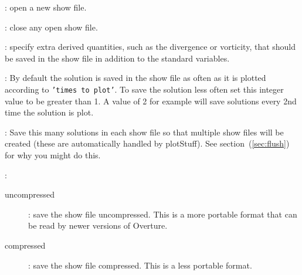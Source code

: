 
 
\newlength{\ShowFileOptionsIncludeArgIndent}

 \begin{description} 
  \item[open] : open a new show file.
  \item[close] : close any open show file.
  \item[show file variables] : specify extra derived quantities, such as the divergence or vorticity, that
      should be saved in the show file in addition to the standard variables.
  \item[frequency to save] : By default the solution is saved in the show file
          as often as it is plotted according to {\tt 'times to plot'}. To save the solution less
          often set this integer value to be greater than 1. A value of 2 for example will save solutions
          every 2nd time the solution is plot.
  \item[frequency to flush] : Save this many solutions in each show file so that multiple
        show files will be created (these are automatically handled by plotStuff). See section~(\ref{sec:flush})
        for why you might do this.  
  \item[properties]: \ 
    \begin{description}
    \item[uncompressed] : save the show file uncompressed. This is a more portable format
     that can be read by newer versions of Overture.
    \item[compressed] : save the show file compressed. This is a less portable format.
   \end{description}
 \end{description}
